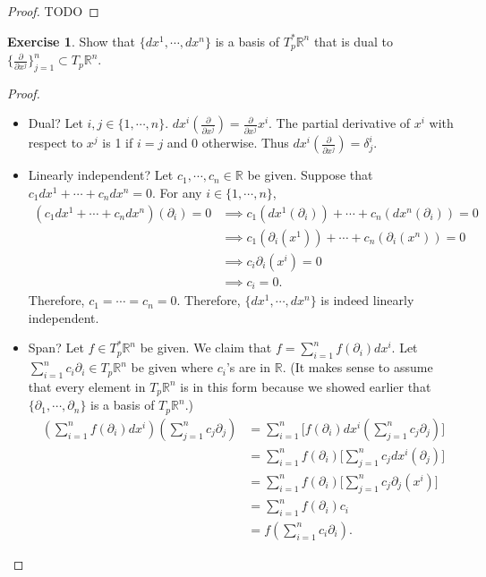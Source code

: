 \documentclass[12pt, psamsfonts]{amsart}
\theoremstyle{definition}
\newtheorem{exer}[thm]{Exercise}
\theoremstyle{remark}
\numberwithin{equation}{section}
\begin{document}
\begin{proof}
  TODO
\end{proof}

\begin{exer}
  Show that $\{ dx^1, \cdots, dx^n \}$ is a basis of $T_p^*\mathbb{R}^n$ that is dual to $\{ \frac{\partial}{\partial x^j} \}^n_{j = 1} \subset T_p\mathbb{R}^n$.
\end{exer}

\begin{proof}
$ $
  \begin{itemize}
    \item
      Dual?
      Let $i, j \in \{1, \cdots, n \}$.
      $dx^i(\frac{\partial}{\partial x^j}) = \frac{\partial}{\partial x^j} x^i$.
      The partial derivative of $x^i$ with respect to $x^j$ is 1 if $i = j$ and 0 otherwise.
      Thus $dx^i(\frac{\partial}{\partial x^j}) = \delta^i_j$.
    \item
      Linearly independent?
      Let $c_1, \cdots, c_n \in \mathbb{R}$ be given.
      Suppose that $c_1dx^1 + \cdots + c_ndx^n = 0$.
      For any $i \in \{ 1, \cdots, n \}$,
      \begin{align*} (c_1dx^1 + \cdots + c_ndx^n)(\partial_i) = 0
          &\implies c_1(dx^1(\partial_i)) + \cdots + c_n(dx^n(\partial_i)) = 0 \\
          &\implies c_1(\partial_i(x^1)) + \cdots + c_n(\partial_i(x^n)) = 0 \\
          &\implies c_i\partial_i(x^i) = 0 \\
          &\implies c_i = 0.
      \end{align*}
      Therefore, $c_1 = \cdots = c_n = 0$.
      Therefore, $\{ dx^1, \cdots, dx^n \}$ is indeed linearly independent.
    \item
      Span?
      Let $f \in T_p^*\mathbb{R}^n$ be given.
      We claim that $f = \sum_{i=1}^{n} f(\partial_i)dx^i$.
      Let $\sum_{i=1}^{n} c_i\partial_i \in T_p \mathbb{R}^n$ be given where $c_i$'s are in $\mathbb{R}$.
      (It makes sense to assume that every element in $T_p\mathbb{R}^n$ is in this form because we showed earlier that $\{ \partial_1, \cdots, \partial_n \}$ is a basis of $T_p \mathbb{R}^n$.)
      \begin{align*}
        (\sum_{i=1}^{n} f(\partial_i)dx^i)(\sum_{j=1}^{n} c_j\partial_j)
          &= \sum_{i=1}^{n} \big[f(\partial_i)dx^i(\sum_{j=1}^{n} c_j\partial_j)\big] \\
          &= \sum_{i=1}^{n} f(\partial_i) \big[\sum_{j=1}^{n} c_jdx^i(\partial_j)\big] \\
          &= \sum_{i=1}^{n} f(\partial_i) \big[\sum_{j=1}^{n} c_j\partial_j(x^i)\big] \\
          &= \sum_{i=1}^{n} f(\partial_i) c_i \\
          &= f(\sum_{i=1}^{n} c_i\partial_i).
      \end{align*}
  \end{itemize}
\end{proof}
\end{document}
